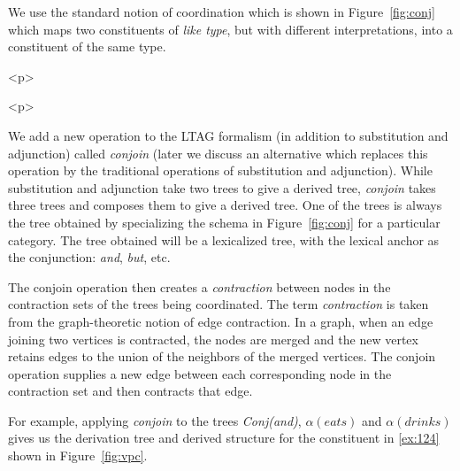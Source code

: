 \beginsentences
{}\label{ex:123} 
\endsentences

 
We use the standard notion of coordination which is shown in 
Figure~\ref{fig:conj} which maps two constituents of {\em like type}, 
but with different interpretations, into a constituent of the same 
type. 
 
\begin{rawhtml} <p> \end{rawhtml}
  \begin{center} 
    \leavevmode 
  \end{center} 
  \begin{rawhtml} <dl> <dt>{Coordination schema <p> </dl> \end{rawhtml}
  \label{fig:conj} 
\begin{rawhtml} <p> \end{rawhtml}
 
We add a new operation to the LTAG formalism (in addition to 
substitution and adjunction) called {\em conjoin} (later we discuss an 
alternative which replaces this operation by the traditional 
operations of substitution and adjunction). While substitution and 
adjunction take two trees to give a derived tree, {\em conjoin\/} 
takes three trees and composes them to give a derived tree.  One of 
the trees is always the tree obtained by specializing the schema in 
Figure~\ref{fig:conj} for a particular category. The tree obtained 
will be a lexicalized tree, with the lexical anchor as the 
conjunction: {\em and}, {\em but}, etc. 
 
The conjoin operation then creates a {\em contraction\/} between nodes 
in the contraction sets of the trees being coordinated.  The term {\em   contraction\/} is taken from the graph-theoretic notion of edge 
contraction. In a graph, when an edge joining two vertices is 
contracted, the nodes are merged and the new vertex retains edges to 
the union of the neighbors of the merged vertices. The conjoin 
operation supplies a new edge between each corresponding node in the 
contraction set and then contracts that edge. 
 
For example, applying {\em conjoin\/} to the trees {\em Conj(and)}, 
$\alpha(eats)$ and $\alpha(drinks)$ gives us the derivation tree and 
derived structure for the constituent in \ref{ex:124} shown in 
Figure~\ref{fig:vpc}. 
 
\beginsentences
{}\label{ex:124} 
\endsentences

